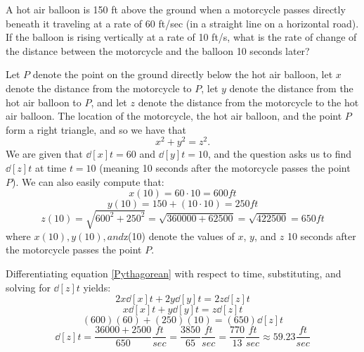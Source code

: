 \documentclass[nooutcomes]{ximera}
\begin{document}
\begin{problem}
A hot air balloon is 150 ft above the ground when a motorcycle passes directly beneath it traveling at a rate of 60 ft/sec (in a straight line on a horizontal road).  If the balloon is rising vertically at a rate of 10 ft/s, what is the rate of change of the distance between the motorcycle and the balloon 10 seconds later?
		\begin{freeResponse}
		Let $P$ denote the point on the ground directly below the hot air balloon, let $x$ denote the distance from the motorcycle to $P$, let $y$ denote the distance from the hot air balloon to $P$, and let $z$ denote the distance from the motorcycle to the hot air balloon.  The location of the motorcycle, the hot air balloon, and the point $P$ form a right triangle, and so we have that 
		\begin{equation}\label{Pythagorean}
		x^2 + y^2 = z^2.
		\end{equation}
		  We are given that $\dd[x]{t} = 60$ and $\dd[y]{t} = 10$, and the question asks us to find $\dd[z]{t}$ at time $t=10$ (meaning 10 seconds after the motorcycle passes the point $P$).  We can also easily compute that:
		$$ x(10) = 60 \cdot 10 = 600 ft $$
		$$ y(10) = 150 + (10 \cdot 10) = 250 ft $$
		$$ z(10) = \sqrt{ 600^2 + 250^2} = \sqrt{360000 + 62500} = \sqrt{422500} = 650 ft $$
		where $x(10), y(10), and $z(10) denote the values of $x$, $y$, and $z$ 10 seconds after the motorcycle passes the point $P$.  
		
		Differentiating equation \ref{Pythagorean} with respect to time, substituting, and solving for $\dd[z]{t}$ yields:
		$$ 2x \dd[x]{t} + 2y \dd[y]{t} = 2z \dd[z]{t} $$
		$$ x \dd[x]{t} + y \dd[y]{t} = z \dd[z]{t} $$
		$$ (600)(60) + (250)(10) = (650) \dd[z]{t} $$
		$$ \dd[z]{t} = \frac{36000 + 2500}{650} \frac{ft}{sec} = \frac{3850}{65} \frac{ft}{sec} = \frac{770}{13} \frac{ft}{sec} \approx 59.23 \frac{ft}{sec} $$
		
		\end{freeResponse}
					
		
\end{problem}
\end{document}
